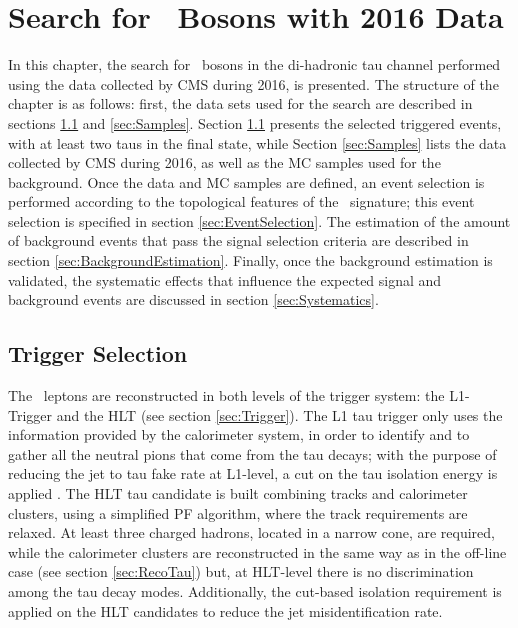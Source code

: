 \chapter[Search For \Zprime~Bosons With 2016 Data]{Search for \Zprime~Bosons with 2016 Data}
\label{chap:Analysis}

In this chapter, the search for \Zprime~bosons in the di-hadronic tau channel
performed using the data collected by CMS during 2016, is presented. The structure of the chapter is as follows:
first, the data sets used for the search are described in sections \ref{sec:TriggerSelection} and 
\ref{sec:Samples}. Section \ref{sec:TriggerSelection} presents the selected triggered events,
with at least two taus in the final state, while Section \ref{sec:Samples} lists 
the data  collected by CMS during 2016, as well as the MC samples used for the 
background. Once the data and MC samples are defined, an event 
selection is performed according to the topological features of 
the \Zprimetotauh~signature; this event selection is specified 
in section \ref{sec:EventSelection}. The estimation of 
the amount of background events that pass the signal 
selection criteria are described in section \ref{sec:BackgroundEstimation}. Finally, 
once the background estimation is validated, the systematic 
effects that influence the expected signal and background events 
are discussed in section \ref{sec:Systematics}.

\section{Trigger Selection}
\label{sec:TriggerSelection}

The \tauh~leptons are reconstructed in both levels of the 
trigger system: the L1-Trigger and the HLT (see section \ref{sec:Trigger}). The L1 
tau trigger only uses the information provided by the calorimeter system, in order to
identify and to gather all the neutral pions that come from the tau decays; with the purpose of reducing
the jet to tau fake rate at L1-level, a cut on the tau isolation energy 
is applied \cite{TauTrigger}. The HLT tau candidate is built combining tracks and calorimeter 
clusters, using a simplified PF algorithm, where the track requirements are relaxed. At least  three 
charged hadrons, located in a narrow cone, are required, while the calorimeter clusters 
are reconstructed in the same way as in the off-line case (see section \ref{sec:RecoTau}) but, 
at HLT-level there is no discrimination among the tau decay modes. Additionally, the cut-based isolation requirement 
is applied on the HLT candidates to reduce the jet misidentification rate.\\

